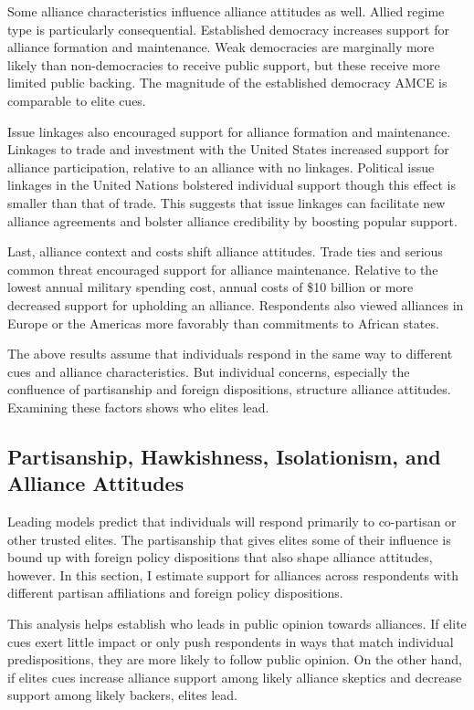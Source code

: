 \documentclass[12pt]{article}
\begin{document}
Some alliance characteristics influence alliance attitudes as well. 
Allied regime type is particularly consequential. 
Established democracy increases support for alliance formation and maintenance.  
Weak democracies are marginally more likely than non-democracies to receive public support, but these receive more limited public backing.
The magnitude of the established democracy AMCE is comparable to elite cues. 


Issue linkages also encouraged support for alliance formation and maintenance. 
Linkages to trade and investment with the United States increased support for alliance participation, relative to an alliance with no linkages. 
Political issue linkages in the United Nations bolstered individual support though this effect is smaller than that of trade. 
This suggests that issue linkages can facilitate new alliance agreements \citep{Poast2012} and bolster alliance credibility \citep{Poast2013} by boosting popular support. 


Last, alliance context and costs shift alliance attitudes. 
Trade ties and serious common threat encouraged support for alliance maintenance. 
Relative to the lowest annual military spending cost, annual costs of \$10 billion or more decreased support for upholding an alliance.  
Respondents also viewed alliances in Europe or the Americas more favorably than commitments to African states. 


The above results assume that individuals respond in the same way to different cues and alliance characteristics. 
But individual concerns, especially the confluence of partisanship and foreign dispositions, structure alliance attitudes.
Examining these factors shows who elites lead.  



\subsection{Partisanship, Hawkishness, Isolationism, and Alliance Attitudes}


Leading models predict that individuals will respond primarily to co-partisan or other trusted elites. 
The partisanship that gives elites some of their influence is bound up with foreign policy dispositions that also shape alliance attitudes, however. 
In this section, I estimate support for alliances across respondents with different partisan affiliations and foreign policy dispositions.  


This analysis helps establish who leads in public opinion towards alliances. 
If elite cues exert little impact or only push respondents in ways that match individual predispositions, they are more likely to follow public opinion. 
On the other hand, if elites cues increase alliance support among likely alliance skeptics and decrease support among likely backers, elites lead. 
\end{document}
